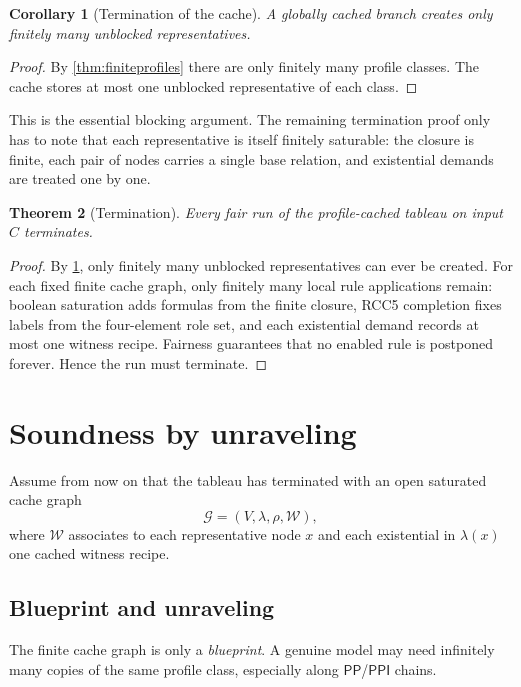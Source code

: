 \documentclass[11pt]{article}
\newtheorem{theorem}{Theorem}[section]
\newtheorem{corollary}[theorem]{Corollary}
\theoremstyle{definition}
\newcommand{\PP}{\mathsf{PP}}
\newcommand{\PPI}{\mathsf{PPI}}
\begin{document}
\begin{corollary}[Termination of the cache]\label{cor:cacheterm}
A globally cached branch creates only finitely many unblocked representatives.
\end{corollary}

\begin{proof}
By \cref{thm:finiteprofiles} there are only finitely many profile classes. The cache stores at most one unblocked representative of each class.
\end{proof}

This is the essential blocking argument. The remaining termination proof only has to note that each representative is itself finitely saturable: the closure is finite, each pair of nodes carries a single base relation, and existential demands are treated one by one.

\begin{theorem}[Termination]\label{thm:termination}
Every fair run of the profile-cached tableau on input $C$ terminates.
\end{theorem}

\begin{proof}
By \cref{cor:cacheterm}, only finitely many unblocked representatives can ever be created. For each fixed finite cache graph, only finitely many local rule applications remain: boolean saturation adds formulas from the finite closure, RCC5 completion fixes labels from the four-element role set, and each existential demand records at most one witness recipe. Fairness guarantees that no enabled rule is postponed forever. Hence the run must terminate.
\end{proof}

\section{Soundness by unraveling}

Assume from now on that the tableau has terminated with an open saturated cache graph
\[
\mathcal G=(V,\lambda,\rho,\mathcal W),
\]
where $\mathcal W$ associates to each representative node $x$ and each existential in $\lambda(x)$ one cached witness recipe.

\subsection{Blueprint and unraveling}

The finite cache graph is only a \emph{blueprint}. A genuine model may need infinitely many copies of the same profile class, especially along $\PP$/$\PPI$ chains.
\end{document}
